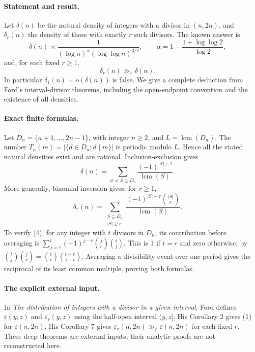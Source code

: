 \paragraph{Statement and result.}
Let \(\delta(n)\) be the natural density of integers with a divisor in
\((n,2n)\), and \(\delta_r(n)\) the density of those with exactly
\(r\) such divisors. The known answer is
\[
 \delta(n)\asymp
 \frac1{(\log n)^\alpha(\log\log n)^{3/2}},\qquad
 \alpha=1-\frac{1+\log\log2}{\log2},
 \tag{1}
\]
and, for each fixed \(r\geq1\),
\[
 \delta_r(n)\gg_r\delta(n).
 \tag{2}
\]
In particular \(\delta_1(n)=o(\delta(n))\) is false.
We give a complete deduction from Ford's interval-divisor theorems,
including the open-endpoint convention and the existence of all densities.

\paragraph{Exact finite formulas.}
Let \(D_n=\{n+1,\ldots,2n-1\}\), with integer \(n\geq2\), and
\(L=\operatorname{lcm}(D_n)\).
The number \(T_n(m)=|\{d\in D_n:d\mid m\}|\) is periodic modulo \(L\).
Hence all the stated natural densities exist and are rational.
Inclusion-exclusion gives
\[
 \delta(n)=
 \sum_{\varnothing\ne S\subseteq D_n}
 \frac{(-1)^{|S|+1}}{\operatorname{lcm}(S)}.
 \tag{3}
\]
More generally, binomial inversion gives, for \(r\geq1\),
\[
 \delta_r(n)=
 \sum_{\substack{S\subseteq D_n\\|S|\geq r}}
 \frac{(-1)^{|S|-r}\binom{|S|}{r}}{\operatorname{lcm}(S)}.
 \tag{4}
\]
To verify (4), for any integer with \(t\) divisors in \(D_n\), its
contribution before averaging is
\(\sum_{j=r}^{t}(-1)^{j-r}\binom jr\binom tj\).
This is \(1\) if \(t=r\) and zero otherwise, by
\(\binom tj\binom jr=\binom tr\binom{t-r}{j-r}\).
Averaging a divisibility event over one period gives the reciprocal
of its least common multiple, proving both formulas.

\paragraph{The explicit external input.}
In \emph{The distribution of integers with a divisor in a given interval},
Ford defines \(\varepsilon(y,z)\) and \(\varepsilon_r(y,z)\) using
the half-open interval \((y,z]\).
His Corollary 2 gives (1) for \(\varepsilon(n,2n)\).
His Corollary 7 gives
\(\varepsilon_r(n,2n)\gg_r\varepsilon(n,2n)\) for each fixed \(r\).
These deep theorems are external inputs; their analytic proofs are
not reconstructed here.

